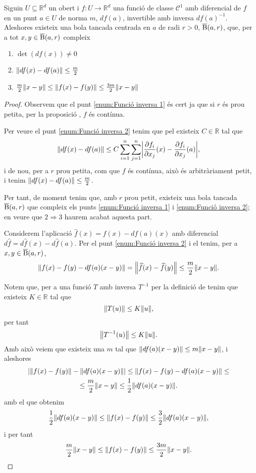 \documentclass[../Apunts.tex]{subfiles}
\begin{document}
	\begin{lemma}\label{lemma:Funció inversa}
		Siguin \(U\subseteq\mathbb{R}^{d}\) un obert i \(f\colon U\to\mathbb{R}^{d}\) una funció de classe \(\mathcal{C}^{1}\) amb diferencial de \(f\) en un punt \(a\in U\) de norma \(m\), \(df(a)\), invertible amb inversa \(df(a)^{-1}\). Aleshores existeix una bola tancada centrada en \(a\) de radi \(r>0\), \(\overline{\operatorname{B}}(a,r)\), que, per a tot \(x,y\in\overline{\operatorname{B}}(a,r)\) compleix
		\begin{enumerate}
			\item\label{enum:Funció inversa 1} \(\det(df(x))\neq0\)
			\item\label{enum:Funció inversa 2} \(\norm{df(x)-df(a)}\leq\frac{m}{2}\)
			\item\label{enum:Funció inversa 3} \(\frac{m}{2}\norm{x-y}\leq\norm{f(x)-f(y)}\leq\frac{3m}{2}\norm{x-y}\)
		\end{enumerate}
		\begin{proof}
			Observem que el punt \eqref{enum:Funció inversa 1} és cert ja que si \(r\) és prou petita, per la proposició , \(f\) és contínua.
			
			Per veure el punt \eqref{enum:Funció inversa 2} tenim que pel  existeix \(C\in\mathbb{R}\) tal que
			\[\norm{df(x)-df(a)}\leq C\sum_{i=1}^{n}\sum_{j=1}^{n}\abs{\frac{\partial f_{i}}{\partial x_{j}}(x)-\frac{\partial f_{i}}{\partial x_{j}}(a)},\]
			i de nou, per a \(r\) prou petita, com que \(f\) és contínua, això és arbitràriament petit, i tenim \(\norm{df(x)-df(a)}\leq\frac{m}{2}\).
			
			Per tant, de moment tenim que, amb \(r\) prou petit, existeix una bola tancada \(\overline{\operatorname{B}}(a,r)\) que compleix els punts \eqref{enum:Funció inversa 1} i \eqref{enum:Funció inversa 2}; en veure que \(\mathit{2}\Rightarrow\mathit{3}\) haurem acabat aquesta part.
			
			Considerem l'aplicació \(\widehat{f}(x)=f(x)-df(a)(x)\) amb diferencial \(d\widehat{f}=d\widehat{f}(x)-d\widehat{f}(a)\). Per el punt \eqref{enum:Funció inversa 2} i el  tenim, per a \(x,y\in\overline{\operatorname{B}}(a,r)\), %
			\[\norm{f(x)-f(y)-df(a)(x-y)}=\norm{\widehat{f}(x)-\widehat{f}(y)}\leq\frac{m}{2}\norm{x-y}.\]
			
			Notem que, per a una funció \(T\) amb inversa \(T^{-1}\) per la definició de  tenim que existeix \(K\in\mathbb{R}\) tal que
			\[\norm{T(u)}\leq K\norm{u},\]
			per tant
			\[\norm{T^{-1}(u)}\leq K\norm{u}.\]
			Amb això veiem que existeix una \(m\) tal que \(\norm{df(a)(x-y)}\leq m\norm{x-y}\), i aleshores
			\begin{multline*}
			\abs{\norm{f(x)-f(y)}-\norm{df(a)(x-y)}}\leq\norm{f(x)-f(y)-df(a)(x-y)}\leq\\\leq\frac{m}{2}\norm{x-y}\leq\frac{1}{2}\norm{df(a)(x-y)}.
			\end{multline*}
			amb el que obtenim
			\[\frac{1}{2}\norm{df(a)(x-y)}\leq\norm{f(x)-f(y)}\leq\frac{3}{2}\norm{df(a)(x-y)},\]
			i per tant
			\[\frac{m}{2}\norm{x-y}\leq\norm{f(x)-f(y)}\leq\frac{3m}{2}\norm{x-y}.\qedhere\]
		\end{proof}
	\end{lemma}
\end{document}
